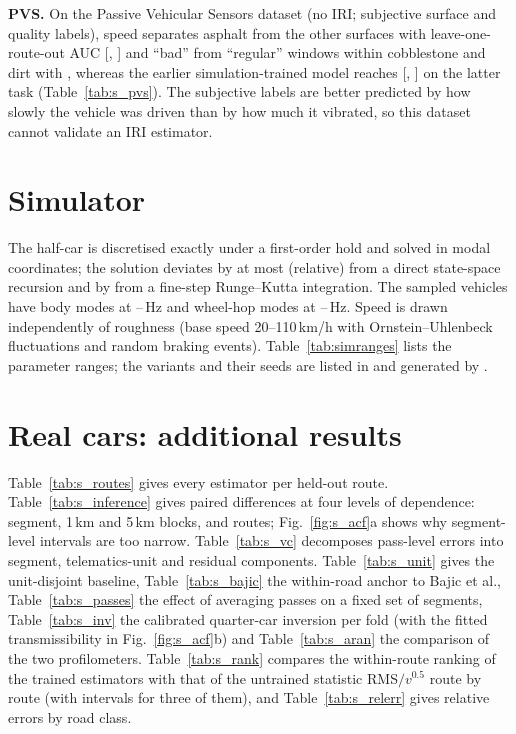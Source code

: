 \documentclass[onecolumn,10pt]{IEEEtran}
\begin{document}
\textbf{PVS.}
On the Passive Vehicular Sensors dataset (no IRI; subjective surface and quality labels), speed separates asphalt from the other surfaces with leave-one-route-out AUC \pvsSurfSpeed{} [\pvsSurfSpeedLo, \pvsSurfSpeedHi] and ``bad'' from ``regular'' windows within cobblestone and dirt with \pvsBadSpeed, whereas the earlier simulation-trained model reaches \pvsBadModel{} [\pvsBadModelLo, \pvsBadModelHi] on the latter task (Table~\ref{tab:s_pvs}).
The subjective labels are better predicted by how slowly the vehicle was driven than by how much it vibrated, so this dataset cannot validate an IRI estimator.




\section{Simulator}
\label{sec:s_sim}
The half-car is discretised exactly under a first-order hold and solved in modal coordinates; the solution deviates by at most \simModalDev{} (relative) from a direct state-space recursion and by \simRkDev{} from a fine-step Runge--Kutta integration.
The sampled vehicles have body modes at \simBodyHzLo--\simBodyHzHi\,Hz and wheel-hop modes at \simHopHzLo--\simHopHzHi\,Hz.
Speed is drawn independently of roughness (base speed 20--110\,km/h with Ornstein--Uhlenbeck fluctuations and random braking events).
Table~\ref{tab:simranges} lists the parameter ranges; the variants and their seeds are listed in  and generated by .



\section{Real cars: additional results}
\label{sec:s_real}
Table~\ref{tab:s_routes} gives every estimator per held-out route.
Table~\ref{tab:s_inference} gives paired differences at four levels of dependence: segment, 1\,km and 5\,km blocks, and routes; Fig.~\ref{fig:s_acf}a shows why segment-level intervals are too narrow.
Table~\ref{tab:s_vc} decomposes pass-level errors into segment, telematics-unit and residual components.
Table~\ref{tab:s_unit} gives the unit-disjoint baseline, Table~\ref{tab:s_bajic} the within-road anchor to Bajic et al., Table~\ref{tab:s_passes} the effect of averaging passes on a fixed set of segments, Table~\ref{tab:s_inv} the calibrated quarter-car inversion per fold (with the fitted transmissibility in Fig.~\ref{fig:s_acf}b) and Table~\ref{tab:s_aran} the comparison of the two profilometers.
Table~\ref{tab:s_rank} compares the within-route ranking of the trained estimators with that of the untrained statistic RMS$/v^{0.5}$ route by route (with intervals for three of them), and Table~\ref{tab:s_relerr} gives relative errors by road class.
\end{document}

